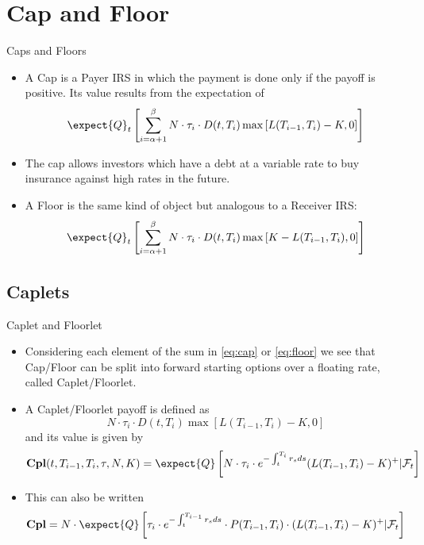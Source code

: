 \documentclass{beamer}
\begin{document}
\section{Cap and Floor}
\begin{frame}{Caps and Floors}
\begin{itemize}
\item<1-> A \textcolor{maincolor}{Cap} is a Payer IRS in which the payment is done \textcolor{maincolor}{only} if the payoff is positive. Its value results from the expectation of
\begin{equation}
	\expect{Q}_t \left[\sum_{i=\alpha+1}^{\beta}N\cdot\tau_i\cdot D(t,T_i)\max\left[L(T_{i-1},T_i)-K,0\right]\right]
	\label{eq:cap}
\end{equation}
\item<2-> The cap allows investors which have a debt at a variable rate to buy insurance against high rates in the future.
\item<3-> A \textcolor{maincolor}{Floor} is the same kind of object but analogous to a Receiver IRS:
\begin{equation}
	\expect{Q}_t \left[\sum_{i=\alpha+1}^{\beta} N\cdot\tau_i\cdot D(t,T_i)\max\left[K-L(T_{i-1},T_i),0\right]\right]
	\label{eq:floor}
\end{equation}
\end{itemize}
\end{frame}

\subsection{Caplets}
\begin{frame}{Caplet and Floorlet}
\begin{itemize}
\item<1-> Considering each element of the sum in \cref{eq:cap} or \cref{eq:floor} we see that Cap/Floor can be split into forward starting options over a floating rate, called \textcolor{maincolor}{Caplet/Floorlet}.
\item<2-> A Caplet/Floorlet payoff is defined as
\begin{equation*}
	N\cdot\tau_i\cdot D(t,T_i)\max\left[L(T_{i-1},T_i)-K,0\right]
\end{equation*}
and its value is given by
\begin{equation}
	\textbf{Cpl}(t,T_{i-1},T_i,\tau,N,K)=\expect{Q}\left[N\cdot\tau_i\cdot e^{-\int_t^{T_i}r_s ds}(L(T_{i-1},T_i)-K)^+ | \mathcal{F}_t\right]
\end{equation}
\item<3-> This can also be written
\begin{equation*}
	\textbf{Cpl}=N\cdot\expect{Q}\left[\tau_i\cdot e^{-\int_t^{T_{i-1}}r_s ds}\cdot P(T_{i-1},T_i)\cdot  (L(T_{i-1},T_i)-K)^+ | \mathcal{F}_t\right]
\end{equation*}
\end{itemize}
\end{frame}
\end{document}
